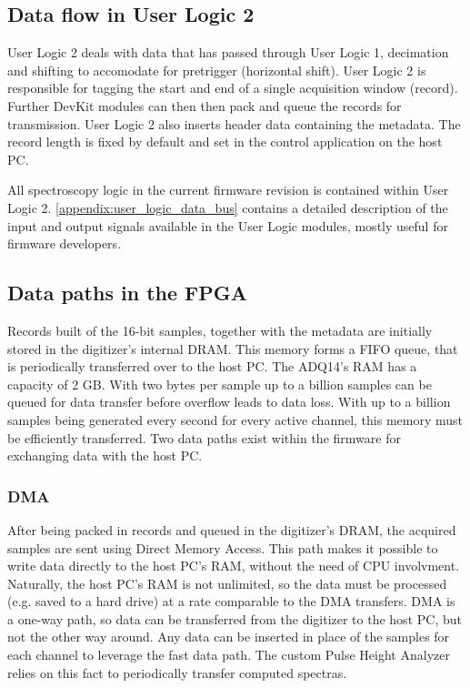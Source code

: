 \documentclass[12pt]{article}
\begin{document}
	\subsection{Data flow in User Logic 2}\label{ssec:data_flow_in_user_logic_2}
		User Logic 2 deals with data that has passed through User Logic 1, 
		decimation and shifting to accomodate for pretrigger (horizontal shift). 
		User Logic 2 is responsible for tagging the start and end of a single acquisition window (record). 
		Further DevKit modules can then then pack and queue the records for transmission.
		User Logic 2 also inserts header data containing the metadata. 
		The record length is fixed by default and set in the control application on the host PC.
		\par
		All spectroscopy logic in the current firmware revision is contained within User Logic 2. 
		\autoref{appendix:user_logic_data_bus} contains a detailed description of the input and output signals 
		available in the User Logic modules, mostly useful for firmware developers.
	\subsection{Data paths in the FPGA}
		Records built of the 16-bit samples, 
		together with the metadata are initially stored in the digitizer's internal DRAM. 
		This memory forms a FIFO queue, that is periodically transferred over to the host PC. 
		The ADQ14's RAM has a capacity of 2 GB. 
		With two bytes per sample up to a billion samples can be queued
		for data transfer before overflow leads to data loss. 
		With up to a billion samples being generated every second for every active channel, 
		this memory must be efficiently transferred.
		Two data paths exist within the firmware for exchanging data with the host PC.
		\subsubsection{DMA}
		After being packed in records and queued in the digitizer's DRAM, the acquired samples are sent
		using Direct Memory Access. This path makes it possible to write data directly to the host PC's RAM, 
		without the need of CPU involvment. Naturally, the host PC's RAM is not unlimited, 
		so the data must be processed (e.g. saved to a hard drive) at a rate comparable to the DMA transfers.
		DMA is a one-way path, so data can be transferred from the digitizer to the host PC,
		but not the other way around.
		Any data can be inserted in place of the samples for each channel to leverage the fast data path. 
		The custom Pulse Height Analyzer relies on this fact to periodically transfer computed spectras.
\end{document}
